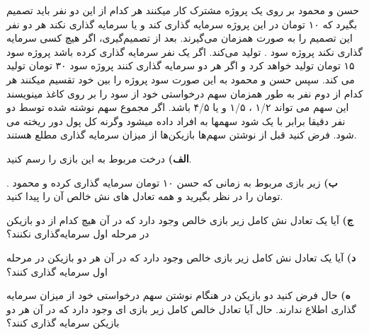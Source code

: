 حسن و محمود بر روی یک پروژه مشترک کار میکنند هر کدام از این دو نفر باید تصمیم بگیرد که ۱۰ تومان در این پروژه سرمایه گذاری کند و یا سرمایه گذاری نکند هر دو نفر این تصمیم را به صورت همزمان می‌گیرند. بعد از تصمیم‌گیری، اگر هیچ کسی سرمایه گذاری نکند پروژه سود . تولید می‌کند. اگر یک نفر سرمایه گذاری کرده باشد پروژه سود ۱۵ تومان تولید خواهد کرد و اگر هر دو سرمایه گذاری کنند پروژه سود ۳۰ تومان تولید می کند. سپس حسن و محمود به این صورت سود پروژه را بین خود تقسیم میکنند هر کدام از دوم نفر به طور همزمان سهم درخواستی خود از سود را بر روی کاغذ مینویسند این سهم می تواند ۱/۲ ، ۱/۵ و یا ۴/۵ باشد. اگر مجموع سهم نوشته شده توسط دو نفر دقیقا برابر با یک شود سهمها به افراد داده میشود وگرنه کل پول دور ریخته می شود. فرض کنید قبل از نوشتن سهم‌ها بازیکن‌ها از میزان سرمایه گذاری مطلع هستند.

\vspace*{10pt}
\textbf{الف)}
درخت مربوط به این بازی را رسم کنید.

\vspace*{5pt}
\textbf{ب)}
زیر بازی مربوط به زمانی که حسن ۱۰ تومان سرمایه گذاری کرده و محمود . تومان را در نظر بگیرید و همه تعادل های نش خالص آن را پیدا کنید.

\vspace*{5pt}
\textbf{ج)}
آیا یک تعادل نش کامل زیر بازی خالص وجود دارد که در آن هیچ کدام از دو بازیکن در مرحله اول سرمایه‌گذاری نکنند؟

\vspace*{5pt}
\textbf{د)}
آیا یک تعادل نش کامل زیر بازی خالص وجود دارد که در آن هر دو بازیکن در مرحله اول سرمایه گذاری کنند؟

\vspace*{5pt}
\textbf{ه)}
حال فرض کنید دو بازیکن در هنگام نوشتن سهم درخواستی خود از میزان سرمایه گذاری اطلاع ندارند. حال آیا تعادل خالص کامل زیر بازی ای وجود دارد که در آن هر دو بازیکن سرمایه گذاری کنند؟